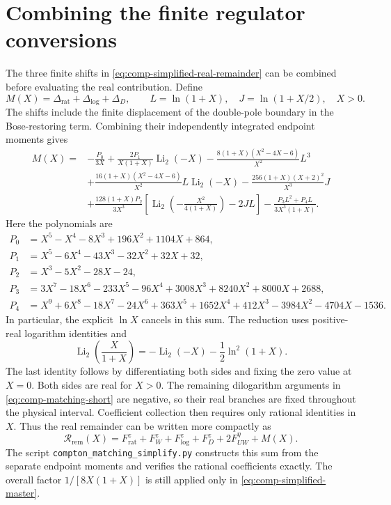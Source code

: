 \section{Combining the finite regulator conversions}
The three finite shifts in \eqref{eq:comp-simplified-real-remainder}
can be combined before evaluating the real contribution. Define
\begin{equation}
 M(X)=\Delta_{\mathrm{rat}}+\Delta_{\log}+\Delta_D,
 \qquad L=\ln(1+X),\quad J=\ln(1+X/2),\quad X>0.
\end{equation}
The shifts include the finite displacement of the double-pole
boundary in the Bose-restoring term. Combining their independently
integrated endpoint moments gives
\begin{equation}
 \begin{aligned}
 M(X)={}&-\frac{P_0}{3X}
 +\frac{2P_1}{X(1+X)}\operatorname{Li}_2(-X)
 -\frac{8(1+X)(X^2-4X-6)}{X^2}L^3\\
 &+\frac{16(1+X)(X^2-4X-6)}{X^2}L\operatorname{Li}_2(-X)
 -\frac{256(1+X)(X+2)^2}{X^3}J\\
 &+\frac{128(1+X)P_2}{3X^3}
 \left[\operatorname{Li}_2\!\left(-\frac{X^2}{4(1+X)}\right)-2JL\right]
 -\frac{P_3L^2+P_4L}{3X^3(1+X)}.
 \end{aligned}
 \label{eq:comp-matching-short}
\end{equation}
Here the polynomials are
\begin{align}
 P_0&=X^5-X^4-8X^3+196X^2+1104X+864,\\
 P_1&=X^5-6X^4-43X^3-32X^2+32X+32,\\
 P_2&=X^3-5X^2-28X-24,\\
 P_3&=3X^7-18X^6-233X^5-96X^4
                 +3008X^3+8240X^2+8000X+2688,\\
 P_4&=X^9+6X^8-18X^7-24X^6+363X^5
                 +1652X^4+412X^3-3984X^2-4704X-1536.
\end{align}
In particular, the explicit $\ln X$ cancels in this sum.
The reduction uses positive-real logarithm identities and
\begin{equation}
 \operatorname{Li}_2\!\left(\frac{X}{1+X}\right)
 =-\operatorname{Li}_2(-X)-\frac12\ln^2(1+X).
\end{equation}
The last identity follows by differentiating both sides and fixing
the zero value at $X=0$. Both sides are real for $X>0$.
The remaining dilogarithm arguments in
\eqref{eq:comp-matching-short} are negative, so their real branches
are fixed throughout the physical interval. Coefficient collection
then requires only rational identities in $X$. Thus the real remainder
can be written more compactly as
\begin{equation}
 \mathcal R_{\mathrm{rem}}(X)
 =F_{\mathrm{rat}}^z+F_W^z+F_{\log}^z+F_D^z
                  +2F_{UW}^{\eta}+M(X).
\end{equation}
The script \nolinkurl{compton_matching_simplify.py} constructs this
sum from the separate endpoint moments and verifies the rational
coefficients exactly. The overall factor $1/[8X(1+X)]$ is still
applied only in \eqref{eq:comp-simplified-master}.
